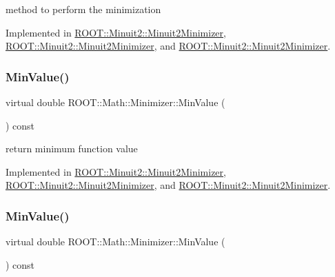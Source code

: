method to perform the minimization 



Implemented in \mbox{\hyperlink{classROOT_1_1Minuit2_1_1Minuit2Minimizer_af5d2da195d2b1a7eac6d9b8859eec2b9}{R\+O\+O\+T\+::\+Minuit2\+::\+Minuit2\+Minimizer}}, \mbox{\hyperlink{classROOT_1_1Minuit2_1_1Minuit2Minimizer_af5d2da195d2b1a7eac6d9b8859eec2b9}{R\+O\+O\+T\+::\+Minuit2\+::\+Minuit2\+Minimizer}}, and \mbox{\hyperlink{classROOT_1_1Minuit2_1_1Minuit2Minimizer_af5d2da195d2b1a7eac6d9b8859eec2b9}{R\+O\+O\+T\+::\+Minuit2\+::\+Minuit2\+Minimizer}}.

\mbox{\label{classROOT_1_1Math_1_1Minimizer_ae4845ff42bc0e244fdfa068c53b9a965}} 
\subsubsection{\texorpdfstring{MinValue()}{MinValue()}\hspace{0.1cm}{\footnotesize\ttfamily [1/3]}}
{\footnotesize\ttfamily virtual double R\+O\+O\+T\+::\+Math\+::\+Minimizer\+::\+Min\+Value (\begin{DoxyParamCaption}{ }\end{DoxyParamCaption}) const\hspace{0.3cm}{\ttfamily [pure virtual]}}



return minimum function value 



Implemented in \mbox{\hyperlink{classROOT_1_1Minuit2_1_1Minuit2Minimizer_a4a1c7fc174527aefab3d8c87bf8c0672}{R\+O\+O\+T\+::\+Minuit2\+::\+Minuit2\+Minimizer}}, \mbox{\hyperlink{classROOT_1_1Minuit2_1_1Minuit2Minimizer_a4a1c7fc174527aefab3d8c87bf8c0672}{R\+O\+O\+T\+::\+Minuit2\+::\+Minuit2\+Minimizer}}, and \mbox{\hyperlink{classROOT_1_1Minuit2_1_1Minuit2Minimizer_a4a1c7fc174527aefab3d8c87bf8c0672}{R\+O\+O\+T\+::\+Minuit2\+::\+Minuit2\+Minimizer}}.

\mbox{\label{classROOT_1_1Math_1_1Minimizer_ae4845ff42bc0e244fdfa068c53b9a965}} 
\subsubsection{\texorpdfstring{MinValue()}{MinValue()}\hspace{0.1cm}{\footnotesize\ttfamily [2/3]}}
{\footnotesize\ttfamily virtual double R\+O\+O\+T\+::\+Math\+::\+Minimizer\+::\+Min\+Value (\begin{DoxyParamCaption}{ }\end{DoxyParamCaption}) const\hspace{0.3cm}{\ttfamily [pure virtual]}}



